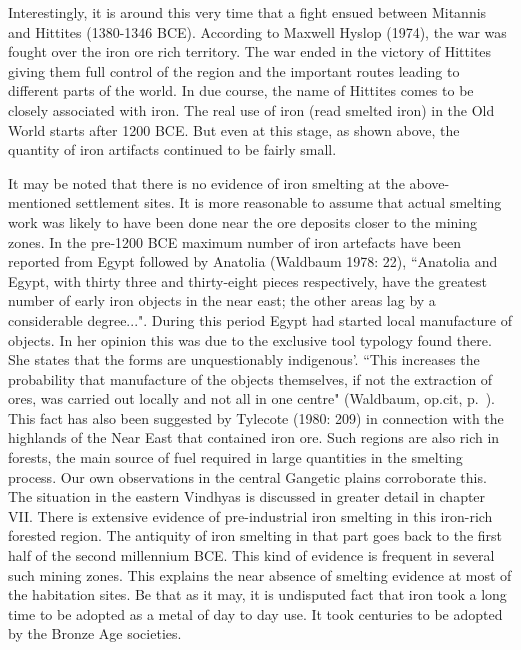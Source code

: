 {Interestingly, it is around this very time that a fight ensued between Mitannis and Hittites (1380-1346 BCE). According to Maxwell Hyslop (1974), the war was fought over the iron ore rich territory. The war ended in the victory of Hittites giving them full control of the region and the important routes leading to different parts of the world. In due course, the name of Hittites comes to be closely associated with iron. The real use of iron (read smelted iron) in the Old World starts after 1200 BCE. But even at this stage, as shown above, the quantity of iron artifacts continued to be fairly small. 

It may be noted that there is no evidence of iron smelting at the above-mentioned settlement sites. It is more reasonable to assume that actual smelting work was likely to have been done near the ore deposits closer to the mining zones. In the pre-1200 BCE maximum number of iron artefacts have been reported from Egypt followed by Anatolia (Waldbaum 1978: 22), {\footnotesize ``Anatolia and Egypt, with thirty three and thirty-eight pieces respectively, have the greatest number of early iron objects in the near east; the other areas lag by a considerable degree...".} During this period Egypt had started local manufacture of objects. In her opinion this was due to the exclusive tool typology found there. She states that the forms are unquestionably indigenous'. ``This increases the probability that manufacture of the objects themselves, if not the extraction of ores, was carried out locally and not all in one centre" (Waldbaum, op.cit, p.~\pageref{pageno23}). This fact has also been suggested by Tylecote (1980: 209) in connection with the highlands of the Near East that contained iron ore. Such regions are also rich in forests, the main source of fuel required in large quantities in the smelting process. Our own observations in the central Gangetic plains corroborate this. The situation in the eastern Vindhyas is discussed in greater detail in chapter VII. There is extensive evidence of pre-industrial iron smelting in this iron-rich forested region. The antiquity of iron smelting in that part goes back to the first half of the second millennium BCE. This kind of evidence is frequent in several such mining zones. This explains the near absence of smelting evidence at most of the habitation sites. Be that as it may, it is undisputed fact that iron took a long time to be adopted as a metal of day to day use. It took centuries to be adopted by the Bronze Age societies. 

}
